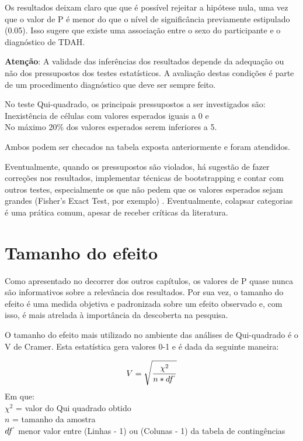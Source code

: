\documentclass[
]{book}
\begin{document}
Os resultados deixam claro que que é possível rejeitar a hipótese nula, uma vez que o valor de P é menor do que o nível de significância previamente estipulado (0.05). Isso sugere que existe uma associação entre o sexo do participante e o diagnóstico de TDAH.

\textbf{Atenção}: A validade das inferências dos resultados depende da adequação ou não dos pressupostos dos testes estatísticos. A avaliação destas condições é parte de um procedimento diagnóstico que deve ser sempre feito.

No teste Qui-quadrado, os principais pressupostos a ser investigados são:\\
Inexistência de células com valores esperados iguais a 0 e\\
No máximo 20\% dos valores esperados serem inferiores a 5.

Ambos podem ser checados na tabela exposta anteriormente e foram atendidos.

Eventualmente, quando os pressupostos são violados, há sugestão de fazer correções nos resultados, implementar técnicas de bootstrapping e contar com outros testes, especialmente os que não pedem que os valores esperados sejam grandes (Fisher's Exact Test, por exemplo) \citep{Campbell2007}. Eventualmente, colapsar categorias é uma prática comum, apesar de receber críticas da literatura.

\hypertarget{tamanho-do-efeito}{%
\section{Tamanho do efeito}\label{tamanho-do-efeito}}

Como apresentado no decorrer dos outros capítulos, os valores de P quase nunca são informativos sobre a relevância dos resultados. Por sua vez, o tamanho do efeito é uma medida objetiva e padronizada sobre um efeito observado e, com isso, é mais atrelada à importância da descoberta na pesquisa.

O tamanho do efeito mais utilizado no ambiente das análises de Qui-quadrado é o V de Cramer. Esta estatística gera valores 0-1 e é dada da seguinte maneira:

\[V=\sqrt\frac{\chi^2}{n*df^`}\]
Em que:\\
\(\chi^2\) = valor do Qui quadrado obtido\\
\(n\) = tamanho da amostra\\
\(df^`\) menor valor entre (Linhas - 1) ou (Colunas - 1) da tabela de contingências
\end{document}
